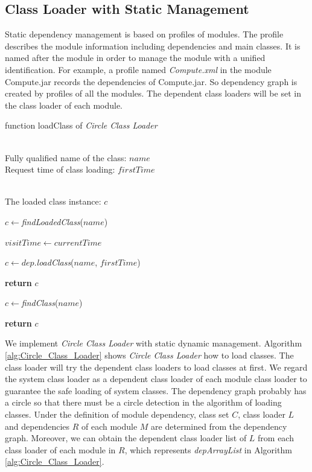 \documentclass[conference]{IEEEtran}
\begin{document}
\subsection{Class Loader with Static Management}

Static dependency management is based on profiles of modules. 
The profile describes the module information including dependencies and main classes. 
It is named after the module in order to manage the module with a unified identification. 
For example, a profile named \emph{Compute.xml} in the module Compute.jar records the dependencies of Compute.jar. 
So dependency graph is created by profiles of all the modules. 
The dependent class loaders will be set in the class loader of each module.

\begin{algorithm}[ht]
\caption{function loadClass of \emph{Circle Class Loader}}
\label{alg:Circle_Class_Loader}
\begin{algorithmic}[1]
\REQUIRE ~~\\
Fully qualified name of the class: $name$ \\
Request time of class loading: $firstTime$

\ENSURE ~~\\
The loaded class instance: $c$

\STATE $c\leftarrow$\emph{findLoadedClass}($name$)


	\STATE $visitTime\leftarrow currentTime$
	
		
		\STATE $c\leftarrow dep.$\emph{loadClass}($name$, $firstTime$)
		
			
			\STATE \textbf{return} $c$

		\ENDIF
	
	\ENDFOR

	\STATE $c\leftarrow$\emph{findClass}($name$)

\ELSE
	
	\STATE \textbf{return} $c$

\ENDIF


\end{algorithmic}
\end{algorithm}

We implement \emph{Circle Class Loader} with static dynamic management.
Algorithm \ref{alg:Circle_Class_Loader} shows \emph{Circle Class Loader} how to load classes. 
The class loader will try the dependent class loaders to load classes at first. 
We regard the system class loader as a dependent class loader of each module class loader to guarantee the safe loading of system classes. 
The dependency graph probably has a circle so that there must be a circle detection in the algorithm of loading classes. 
Under the definition of module dependency, class set $C$, class loader $L$ and dependencies $R$ of each module $M$ are determined from the dependency graph. 
Moreover, we can obtain the dependent class loader list of $L$ from each class loader of each module in $R$, which represents \emph{depArrayList} in Algorithm \ref{alg:Circle_Class_Loader}. 
\end{document}
